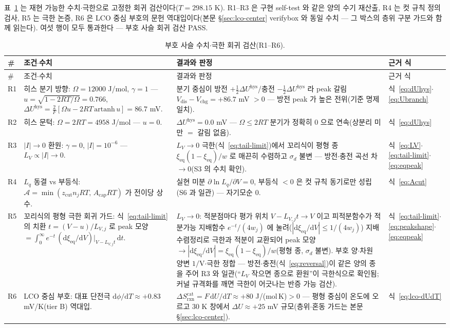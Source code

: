 \documentclass[11pt,a4paper]{article}
\newcommand{\dd}{\mathrm{d}}
\newcommand{\eq}{\mathrm{eq}}
\newcommand{\rxn}{\mathrm{rxn}}
\newcommand{\dis}{\mathrm{dis}}
\newcommand{\chg}{\mathrm{chg}}
\newcommand{\hys}{\mathrm{hys}}
\begin{document}
표~\ref{tab:signcheck-R} 는 재현 가능한 수치$\cdot$극한으로 고정한 회귀 검산이다($T=298.15$ K).
R1--R3 은 구현 self-test 와 같은 양의 수기 재산출, R4 는 컷 규칙 정의 검사, R5 는 극한 논증,
R6 은 LCO 중심 부호의 문헌 역대입이다(본문 \S\ref{sec:lco-center} verifybox 와 동일 수치 ---
그 박스의 층위 구분 가드와 함께 읽는다). 여섯 행이 모두 통과한다 --- 부호 사슬 회귀 검산 PASS.

\begin{longtable}{@{}l p{6.4cm} p{5.2cm} p{2.4cm}@{}}
\caption{부호 사슬 수치$\cdot$극한 회귀 검산(R1--R6).}\label{tab:signcheck-R}\\
\toprule
\# & 조건$\cdot$수치 & 결과와 판정 & 근거 식 \\
\midrule
\endfirsthead
\toprule
\# & 조건$\cdot$수치 & 결과와 판정 & 근거 식 \\
\midrule
\endhead
R1 & 히스 분기 방향: $\Omega=12000$ J/mol, $\gamma=1$ ---
$u=\sqrt{1-2RT/\Omega}=0.766$, $\Delta U^\hys=\frac{2}{F}[\Omega u-2RT\,\mathrm{artanh}\,u]=86.7$ mV.
& 분기 중심이 방전 $+\tfrac12\Delta U^\hys$/충전 $-\tfrac12\Delta U^\hys$ 라 peak 갈림
$V_\dis-V_\chg=+86.7$ mV $>0$ --- 방전 peak 가 높은 전위(기준 명제 일치).
& 식~\eqref{eq:dUhys}$\cdot$\eqref{eq:Ubranch} \\
R2 & 히스 문턱: $\Omega=2RT=4958$ J/mol --- $u=0$.
& $\Delta U^\hys=0.0$ mV --- $\Omega\le2RT$ 분기가 정확히 $0$ 으로 연속(상분리 미만 $=$ 갈림 없음).
& 식~\eqref{eq:dUhys} \\
R3 & $|I|\!\to\!0$ 환원: $\gamma=0$, $|I|=10^{-6}$ --- $L_V\propto|I|\to0$.
& $L_V\to0$ 극한(식~\eqref{eq:tail-limit})에서 꼬리식이 평형 종 $\xi_\eq(1-\xi_\eq)/w$ 로 매끈히 수렴하고 $\sigma_d$ 불변 ---
방전$\cdot$충전 곡선 차 $\to0$(S3 의 수치 확인).
& 식~\eqref{eq:LV}$\cdot$ \eqref{eq:tail-limit}$\cdot$\eqref{eq:eqpeak} \\
R4 & $L_q$ 동결 vs 부등식: $\mathcal A=\min(z_\mathrm{cut}n_jRT,\,A_\mathrm{cap}RT)$ 가 전이당 상수.
& 실현 미분 $\partial\ln L_q/\partial V=0$, 부등식 $<0$ 은 컷 규칙 동기로만 성립(S6 과 일관) ---
자기모순 $0$. & 식~\eqref{eq:Acut} \\
R5 & 꼬리식의 평형 극한 회귀 가드: 식~\eqref{eq:tail-limit} 의 치환 $t=(V-u)/L_{V,j}$ 로
peak 모양 $=\int_0^\infty e^{-t}\,(\dd\xi_\eq/\dd V)|_{V-L_{V,j}t}\,\dd t$.
& $L_V\to0$: 적분점마다 평가 위치 $V-L_{V,j}t\to V$ 이고 피적분함수가 적분가능 지배함수 $e^{-t}/(4w_j)$ 에
눌려($|\dd\xi_\eq/\dd V|\le1/(4w_j)$) 지배수렴정리로 극한과 적분이 교환되어 peak 모양
$\to|\dd\xi_\eq/\dd V|=\xi_\eq(1-\xi_\eq)/w$(평형 종, $\sigma_d$ 불변). 부호 양$\cdot$차원 양변 $1/$V$\cdot$극한 정합
--- 방전$\cdot$충전(식~\eqref{eq:reversal})이 같은 양의 종을 주어 R3 와 일관(``$L_V$ 작으면 종으로 환원''이
극한식으로 확인됨; 커널 규격화를 깨면 극한이 어긋나는 반증 가능 검산).
& 식~\eqref{eq:tail-limit}$\cdot$ \eqref{eq:peakshape}$\cdot$ \eqref{eq:eqpeak} \\
R6 & LCO 중심 부호: 대표 단전극 $\dd\phi/\dd T\approx+0.83$ mV/K(tier B)\cite{swiderska2019} 역대입.
& $\Delta S_{\rxn}^\mathrm{cat}=F\,\dd U/\dd T\approx+80$ J/(mol\,K)$>0$ --- 평형 중심이 온도에 오르고
$30$ K 창에서 $\Delta U\approx+25$ mV 규모(층위$\cdot$혼동 가드는 본문 \S\ref{sec:lco-center}).
& 식~\eqref{eq:lco-dUdT} \\
\bottomrule
\end{longtable}
\end{document}
